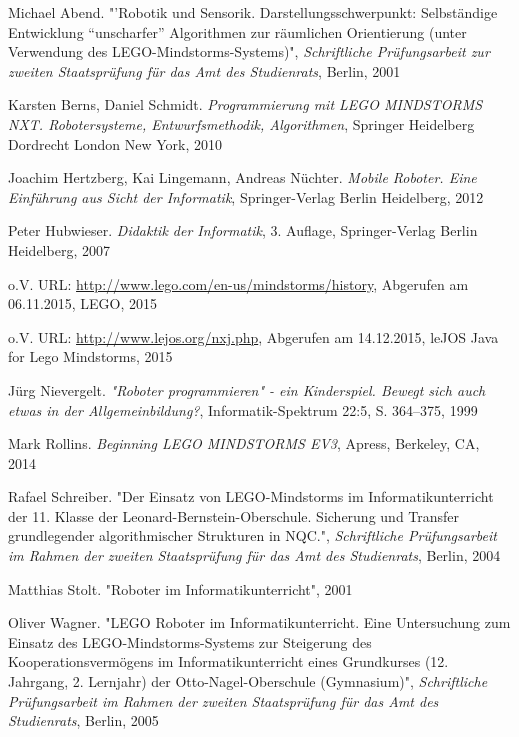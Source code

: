 \begin{thebibliography}{ABCD}

\renewcommand{\refname}{\normalsize Literaturverzeichnis}

Michael Abend. "'Robotik und Sensorik. Darstellungsschwerpunkt: Selbständige Entwicklung "`unscharfer"' Algorithmen zur räumlichen Orientierung (unter Verwendung des LEGO-Mindstorms-Systems)", \emph{Schriftliche Prüfungsarbeit zur zweiten Staatsprüfung für das Amt des Studienrats}, Berlin, 2001

Karsten Berns, Daniel Schmidt. \emph{Programmierung mit LEGO MINDSTORMS NXT. Robotersysteme, Entwurfsmethodik, Algorithmen}, Springer Heidelberg Dordrecht London New York, 2010

Joachim Hertzberg, Kai Lingemann, Andreas Nüchter. \emph{Mobile Roboter. Eine Einführung aus Sicht der Informatik}, Springer-Verlag Berlin Heidelberg, 2012

Peter Hubwieser. \emph{Didaktik der Informatik}, 3. Auflage, Springer-Verlag Berlin Heidelberg, 2007

o.V. URL: \url{http://www.lego.com/en-us/mindstorms/history}, Abgerufen am 06.11.2015, LEGO, 2015

o.V. URL: \url{http://www.lejos.org/nxj.php}, Abgerufen am 14.12.2015, leJOS Java for Lego Mindstorms, 2015

Jürg Nievergelt. \emph{"Roboter programmieren" - ein Kinderspiel. Bewegt sich auch etwas in der Allgemeinbildung?}, Informatik-Spektrum 22:5, S. 364--375, 1999

Mark Rollins. \emph{Beginning LEGO MINDSTORMS EV3}, Apress, Berkeley, CA, 2014

Rafael Schreiber. "Der Einsatz von LEGO-Mindstorms im Informatikunterricht der 11. Klasse der Leonard-Bernstein-Oberschule. Sicherung und Transfer grundlegender algorithmischer Strukturen in NQC.", \emph{Schriftliche Prüfungsarbeit im Rahmen der zweiten Staatsprüfung für das Amt des Studienrats}, Berlin, 2004

Matthias Stolt. "Roboter im Informatikunterricht", 2001

Oliver Wagner. "LEGO Roboter im Informatikunterricht. Eine Untersuchung zum Einsatz des LEGO-Mindstorms-Systems zur Steigerung des Kooperationsvermögens im Informatikunterricht eines Grundkurses (12. Jahrgang, 2. Lernjahr) der Otto-Nagel-Oberschule (Gymnasium)", \emph{Schriftliche Prüfungsarbeit im Rahmen der zweiten Staatsprüfung für das Amt des Studienrats}, Berlin, 2005

\end{thebibliography}